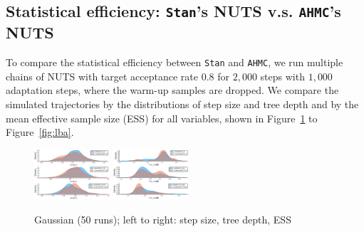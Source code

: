 \documentclass[tablecaption=bottom,wcp]{jmlr} %
\def\ahmcs{\texttt{AHMC}'s }
\def\stans{\texttt{Stan}'s }
\begin{document}
\subsection{Statistical efficiency: \stans NUTS v.s. \ahmcs NUTS}
To compare the statistical efficiency between \texttt{Stan} and \texttt{AHMC},
we run multiple chains of NUTS with target acceptance rate $0.8$ 
for $2,000$ steps with $1,000$ adaptation steps,
where the warm-up samples are dropped.
We compare the simulated trajectories by the distributions of step size and tree depth and by the mean effective sample size (ESS) for all variables, shown in Figure~\ref{fig:gauss} to Figure~\ref{fig:lba}.
\begin{figure}[ht]
    \includegraphics[width=0.25\textwidth]{images/Gaussian/density_epsilon.pdf}
    \includegraphics[width=0.25\textwidth]{images/Gaussian/density_tree_depth.pdf}
    \;\hfill
    \hfill\;
    \caption{Gaussian (50 runs); left to right: step size, tree depth, ESS}
    \label{fig:gauss}
\end{figure}
\end{document}
